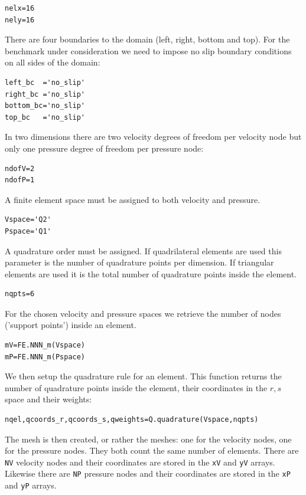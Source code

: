 \begin{lstlisting}
nelx=16
nely=16
\end{lstlisting}

There are four boundaries to the domain (left, right, bottom and top). For the 
benchmark under consideration we need to impose no slip boundary conditions 
on all sides of the domain:
\begin{lstlisting}
left_bc  ='no_slip'
right_bc ='no_slip'
bottom_bc='no_slip'
top_bc   ='no_slip'
\end{lstlisting}

In two dimensions there are two velocity degrees of freedom per 
velocity node but only one pressure degree of freedom per pressure node:
\begin{lstlisting}
ndofV=2
ndofP=1
\end{lstlisting}

A finite element space must be assigned to both velocity and pressure. 
\begin{lstlisting}
Vspace='Q2'
Pspace='Q1'
\end{lstlisting}

A quadrature order must be assigned. If quadrilateral elements are used
this parameter is the number of quadrature points per dimension. 
If triangular elements are used it is the total number of quadrature points 
inside the element.  
\begin{lstlisting}
nqpts=6
\end{lstlisting}

For the chosen velocity and pressure spaces we retrieve the number of nodes 
('support points') inside an element.
\begin{lstlisting}
mV=FE.NNN_m(Vspace)
mP=FE.NNN_m(Pspace)
\end{lstlisting}

We then setup the quadrature rule for an element. This function 
returns the number of quadrature points inside the element, 
their coordinates in the $r,s$ space and their weights: 
\begin{lstlisting}
nqel,qcoords_r,qcoords_s,qweights=Q.quadrature(Vspace,nqpts)
\end{lstlisting}

The mesh is then created, or rather the meshes: one for the 
velocity nodes, one for the pressure nodes. They both count the 
same number of elements. There are \lstinline{NV} velocity nodes and their
coordinates are stored in the \lstinline{xV} and \lstinline{yV} arrays.
Likewise there are \lstinline{NP} pressure nodes and their
coordinates are stored in the \lstinline{xP} and \lstinline{yP} arrays. 

